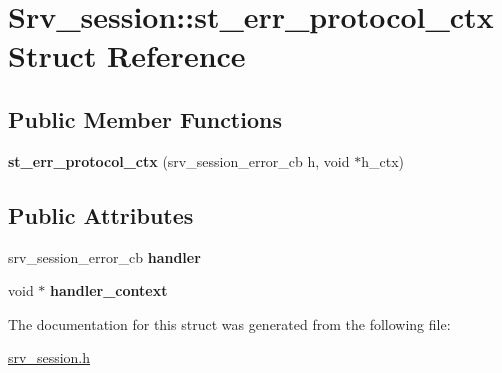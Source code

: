 \hypertarget{structSrv__session_1_1st__err__protocol__ctx}{}\section{Srv\+\_\+session\+:\+:st\+\_\+err\+\_\+protocol\+\_\+ctx Struct Reference}
\label{structSrv__session_1_1st__err__protocol__ctx}
\subsection*{Public Member Functions}
\begin{DoxyCompactItemize}
\item 
\mbox{\label{structSrv__session_1_1st__err__protocol__ctx_a6df2c03dc7072feaf5f53146fa14f231}} 
{\bfseries st\+\_\+err\+\_\+protocol\+\_\+ctx} (srv\+\_\+session\+\_\+error\+\_\+cb h, void $\ast$h\+\_\+ctx)
\end{DoxyCompactItemize}
\subsection*{Public Attributes}
\begin{DoxyCompactItemize}
\item 
\mbox{\label{structSrv__session_1_1st__err__protocol__ctx_a6acedba3caa4eefec6d3357a04848f99}} 
srv\+\_\+session\+\_\+error\+\_\+cb {\bfseries handler}
\item 
\mbox{\label{structSrv__session_1_1st__err__protocol__ctx_a7f08da8828c9edf19bfcba72a908b27d}} 
void $\ast$ {\bfseries handler\+\_\+context}
\end{DoxyCompactItemize}


The documentation for this struct was generated from the following file\+:\begin{DoxyCompactItemize}
\item 
\mbox{\hyperlink{srv__session_8h}{srv\+\_\+session.\+h}}\end{DoxyCompactItemize}
